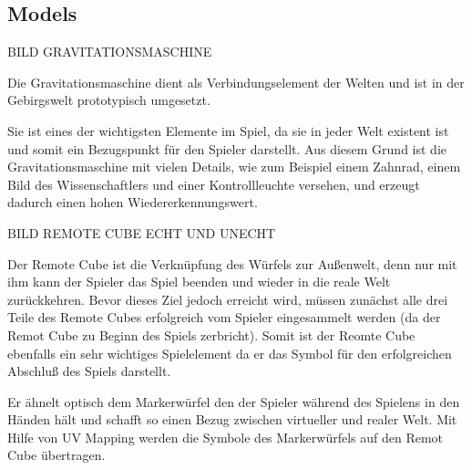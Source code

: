 \subsection{Models}


BILD GRAVITATIONSMASCHINE

Die Gravitationsmaschine dient als Verbindungselement der Welten und ist in der Gebirgswelt prototypisch umgesetzt.

Sie ist eines der wichtigsten Elemente im Spiel, da sie in jeder Welt existent ist und somit ein Bezugspunkt für den Spieler darstellt. Aus diesem Grund ist die Gravitationsmaschine mit vielen Details, wie zum Beispiel einem Zahnrad, einem Bild des Wissenschaftlers und einer Kontrollleuchte versehen, und  erzeugt dadurch einen hohen Wiedererkennungswert. 


BILD REMOTE CUBE ECHT UND UNECHT

Der Remote Cube ist die Verknüpfung des Würfels zur Außenwelt, denn nur mit ihm kann der Spieler das Spiel beenden und wieder in die reale Welt zurückkehren. Bevor dieses Ziel jedoch erreicht wird, müssen zunächst alle drei Teile des Remote Cubes erfolgreich vom Spieler eingesammelt werden (da der Remot Cube zu Beginn des Spiels zerbricht). Somit ist der Reomte Cube ebenfalls ein sehr wichtiges Spielelement da er das Symbol für den erfolgreichen Abschluß des Spiels darstellt.

Er ähnelt optisch dem Markerwürfel den der Spieler während des Spielens in den Händen hält und schafft so einen Bezug zwischen virtueller und realer Welt. Mit Hilfe von UV Mapping werden die Symbole des Markerwürfels auf den Remot Cube übertragen.